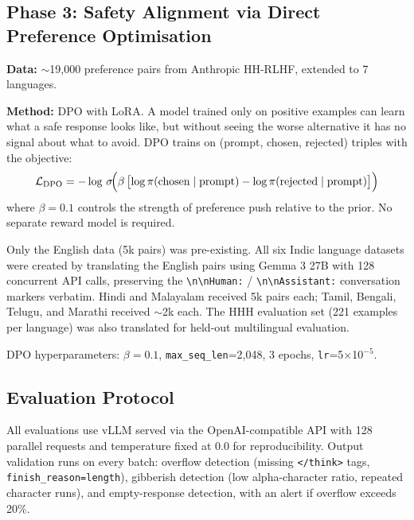 \documentclass[12pt,a4paper]{article}
\begin{document}
\subsection{Phase 3: Safety Alignment via Direct Preference Optimisation}

\textbf{Data:} $\sim$19,000 preference pairs from Anthropic HH-RLHF, extended to 7 languages.

\textbf{Method:} DPO with LoRA. A model trained only on positive examples can learn what a safe response looks like, but without seeing the worse alternative it has no signal about what to avoid. DPO trains on (prompt, chosen, rejected) triples with the objective:
\[
\mathcal{L}_{\text{DPO}} = -\log\,\sigma\!\Bigl(\beta\,\bigl[\log\pi(\text{chosen}\mid\text{prompt}) - \log\pi(\text{rejected}\mid\text{prompt})\bigr]\Bigr)
\]
where $\beta=0.1$ controls the strength of preference push relative to the prior. No separate reward model is required.

Only the English data (5k pairs) was pre-existing. All six Indic language datasets were created by translating the English pairs using Gemma 3 27B with 128 concurrent API calls, preserving the \texttt{\textbackslash n\textbackslash nHuman:} / \texttt{\textbackslash n\textbackslash nAssistant:} conversation markers verbatim. Hindi and Malayalam received 5k pairs each; Tamil, Bengali, Telugu, and Marathi received $\sim$2k each. The HHH evaluation set (221 examples per language) was also translated for held-out multilingual evaluation.

DPO hyperparameters: $\beta=0.1$, \texttt{max\_seq\_len}=2,048, 3 epochs, \texttt{lr}=5$\times$10$^{-5}$.

\subsection{Evaluation Protocol}

All evaluations use vLLM served via the OpenAI-compatible API with 128 parallel requests and temperature fixed at 0.0 for reproducibility. Output validation runs on every batch: overflow detection (missing \texttt{</think>} tags, \texttt{finish\_reason=length}), gibberish detection (low alpha-character ratio, repeated character runs), and empty-response detection, with an alert if overflow exceeds 20\%.
\end{document}
